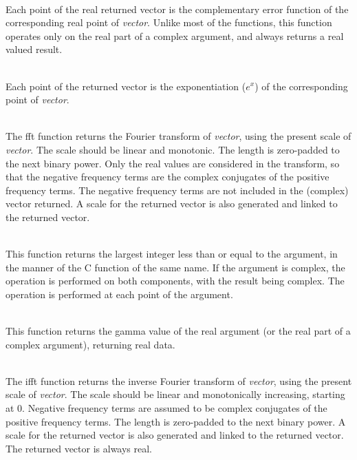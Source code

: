\begin{description}
\item{}\\
Each point of the real returned vector is the complementary error
function of the corresponding real point of {\it vector}.  Unlike most
of the functions, this function operates only on the real part of a
complex argument, and always returns a real valued result.

\item{}\\
Each point of the returned vector is the exponentiation ($e^x$)
of the corresponding point of {\it vector\/}.

\item{}\\
The {\vt fft} function returns the Fourier transform of {\it
vector\/}, using the present scale of {\it vector}.  The scale should
be linear and monotonic.  The length is zero-padded to the next binary
power.  Only the real values are considered in the transform, so that
the negative frequency terms are the complex conjugates of the
positive frequency terms.  The negative frequency terms are not
included in the (complex) vector returned.  A scale for the returned
vector is also generated and linked to the returned vector.

\item{}\\
This function returns the largest integer less than or equal to the
argument, in the manner of the C function of the same name.  If the
argument is complex, the operation is performed on both components,
with the result being complex.  The operation is performed at each
point of the argument.

\item{}\\
This function returns the gamma value of the real argument (or the
real part of a complex argument), returning real data.

\item{}\\
The {\vt ifft} function returns the inverse Fourier transform of {\it
vector\/}, using the present scale of {\it vector\/}.  The scale
should be linear and monotonically increasing, starting at 0. 
Negative frequency terms are assumed to be complex conjugates of the
positive frequency terms.  The length is zero-padded to the next
binary power.  A scale for the returned vector is also generated and
linked to the returned vector.  The returned vector is always real.


\end{description}
